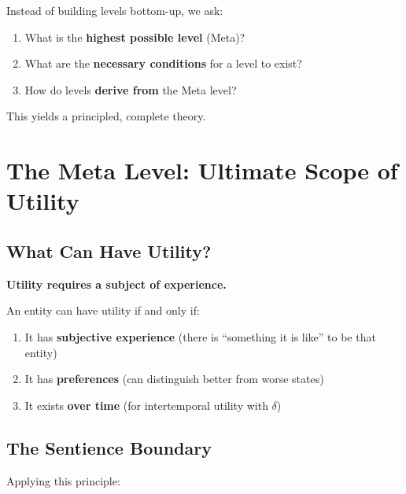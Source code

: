 Instead of building levels bottom-up, we ask:
\begin{enumerate}
\item What is the \textbf{highest possible level} (Meta)?
\item What are the \textbf{necessary conditions} for a level to exist?
\item How do levels \textbf{derive from} the Meta level?
\end{enumerate}

This yields a principled, complete theory.

\section{The Meta Level: Ultimate Scope of Utility}
\label{sec:aaa-meta}

\subsection{What Can Have Utility?}

\begin{tcolorbox}[colback=blue!5!white, colframe=blue!75!black, title=Fundamental Principle]
\textbf{Utility requires a subject of experience.}

An entity can have utility if and only if:
\begin{enumerate}
\item It has \textbf{subjective experience} (there is ``something it is like'' to be that entity)
\item It has \textbf{preferences} (can distinguish better from worse states)
\item It exists \textbf{over time} (for intertemporal utility with $\delta$)
\end{enumerate}
\end{tcolorbox}

\subsection{The Sentience Boundary}

Applying this principle:

